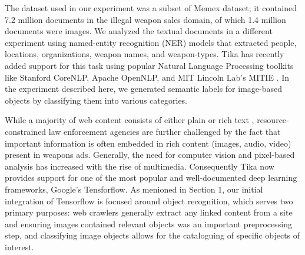 The dataset used in our experiment was a subset of Memex dataset; it contained 7.2 million documents in the illegal weapon sales domain, of which 1.4 million documents were images. We analyzed the textual documents in a different experiment using named-entity recognition (NER) models that extracted people, locations, organizations, weapon names, and weapon-types. Tika has recently added support for this task using popular Natural Language Processing toolkits like Stanford CoreNLP\cite{Finkel:2005:INI:1219840.1219885}, Apache OpenNLP\cite{ApacheOpenNLP}, and MIT Lincoln Lab's MITIE \cite{MITIE-github}. In the experiment described here, we generated semantic labels for image-based objects by classifying them into various categories.

While a majority of web content consists of either plain or rich text \cite{mphillips-EOT2012}, resource-constrained law enforcement agencies are further challenged by the fact that important information is often embedded in rich content (images, audio, video) present in weapons ads. Generally,  the need for computer vision and pixel-based analysis has increased with the rise of multimedia. Consequently Tika now provides support for one of the most popular and well-documented deep learning frameworks, Google's Tensforflow. As menioned in Section 1, our initial integration of Tensorflow is focused around object recognition, which serves two primary purposes: web crawlers generally extract any linked content from a site and ensuring images contained relevant objects was an important preprocessing step, and classifying image objects allows for the cataloguing of specific objects of interest. 


